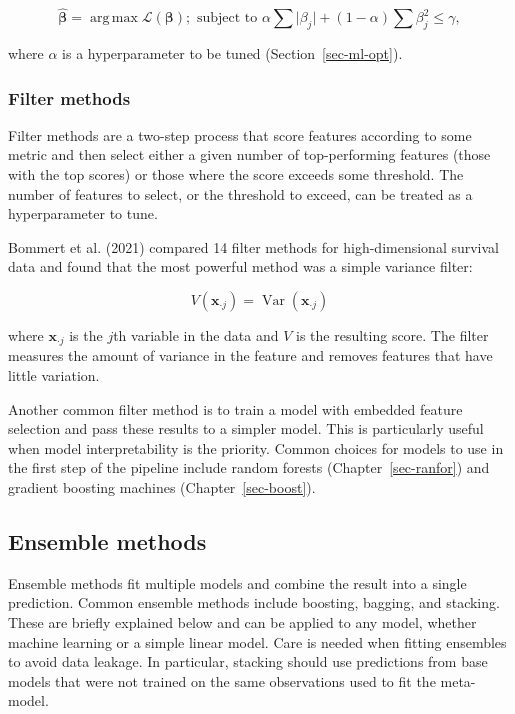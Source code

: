 \documentclass[
  letterpaper,
  krantz2]{style/krantz}
\begin{document}
\[
\hat{\boldsymbol{\beta}} = \mathop{\mathrm{arg\,max}}\mathcal{L}(\boldsymbol{\beta}); \text{ subject to } \alpha \sum \vert \beta_j \vert + (1-\alpha) \sum \beta_j^2 \leq \gamma,
\]

where \(\alpha\) is a hyperparameter to be tuned
(Section~\ref{sec-ml-opt}).

\subsubsection{Filter methods}\label{filter-methods}

Filter methods are a two-step process that score features according to
some metric and then select either a given number of top-performing
features (those with the top scores) or those where the score exceeds
some threshold.  The number of features to
select, or the threshold to exceed, can be treated as a hyperparameter
to tune.

Bommert et al. (2021) compared 14 filter methods for high-dimensional
survival data and found that the most powerful method was a simple
variance filter:

\[
V(\mathbf{x}_{\cdot j}) = \operatorname{Var}(\mathbf{x}_{\cdot j})
\]

where \(\mathbf{x}_{\cdot j}\) is the \(j\)th variable in the data and
\(V\) is the resulting score. The filter measures the amount of variance
in the feature and removes features that have little variation.

Another common filter method is to train a model with embedded feature
selection and pass these results to a simpler model. This is
particularly useful when model interpretability is the priority. Common
choices for models to use in the first step of the pipeline include
random forests (Chapter~\ref{sec-ranfor}) and gradient boosting machines
(Chapter~\ref{sec-boost}).

\subsection{Ensemble methods}\label{ensemble-methods}

Ensemble methods fit multiple models and combine the result into a
single prediction. Common ensemble methods include boosting, bagging,
and stacking.
 These
are briefly explained below and can be applied to any model, whether
machine learning or a simple linear model. Care is needed when fitting
ensembles to avoid data leakage. In particular, stacking should use
predictions from base models that were not trained on the same
observations used to fit the meta-model.
\end{document}
